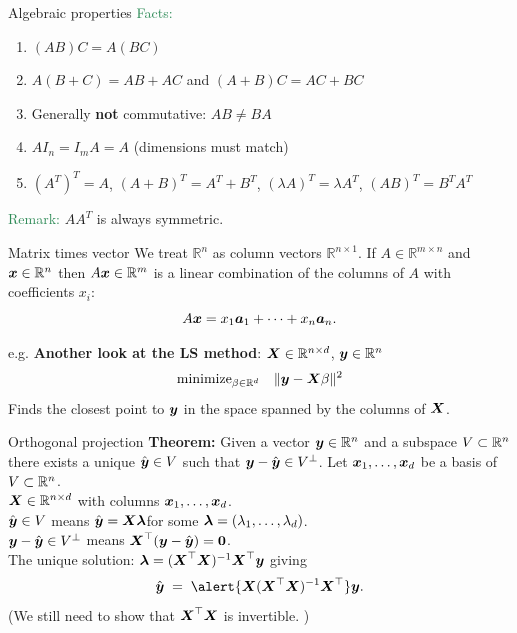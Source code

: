 \documentclass{beamer}
\begin{document}
\begin{frame}{Algebraic properties}
\textcolor{SeaGreen}{Facts:}
\begin{enumerate}
\item $(AB)C=A(BC)$\\[3mm]
\item $A(B+C)=AB+AC$ and $(A+B)C=AC+BC$\\[3mm]
\item Generally \textbf{not} commutative: $AB\neq BA$\\[3mm]
\item $AI_n=I_mA=A$ (dimensions must match)\\[3mm]
\item $(A^T)^T=A$, $(A+B)^T=A^T+B^T$, $(\lambda A)^T=\lambda A^T$, $(AB)^T=B^T A^T$
\end{enumerate}
\bigskip
 
\textcolor{SeaGreen}{Remark:} $AA^T$ is always symmetric.
\end{frame}

\begin{frame}{Matrix times vector}
We treat $\mathbb{R}^n$ as column vectors $\mathbb{R}^{n\times 1}$. If $A\in\mathbb{R}^{m\times n}$ and $\boldsymbol x\in\mathbb{R}^n$ then $A\boldsymbol x\in\mathbb{R}^m$ is a linear combination of the columns of $A$ with coefficients $x_i$:
\[
A\boldsymbol x = x_1\boldsymbol a_1+\cdots+x_n\boldsymbol a_n.
\]
\bigskip

e.g. \textbf{Another look at the LS method}: $\boldsymbol X\in \mathbb R^{n\times d}$, $\boldsymbol y\in \mathbb R^n$
$$
{\rm minimize}_{\beta\in \mathbb R^d}\quad \|\boldsymbol y-\boldsymbol X\beta\|^2
$$
Finds the closest point to $\boldsymbol y$ in the space spanned by the columns of $\boldsymbol X$.
\end{frame}

\begin{frame}[label=orthogonal2]{Orthogonal projection}
		\textbf{Theorem: }Given a vector $\boldsymbol y\in \mathbb R^n$ and a subspace $V\subset \mathbb R^n$ there exists a unique $\hat{\boldsymbol y}\in V$ such that \;\;$\boldsymbol y-\hat{\boldsymbol y}\in V^\perp$.
	Let $\boldsymbol x_1,\ldots,\boldsymbol x_d$ be a basis of $V\subset \mathbb R^n$.\\[.3cm]
	$\boldsymbol X\in \mathbb R^{n\times d}$ with columns  $\boldsymbol x_1,\ldots,\boldsymbol x_d$.\\[.5cm]
	$\hat{\boldsymbol y}\in V$ means \quad $\hat{\boldsymbol y}=\boldsymbol X\boldsymbol \lambda$\quad  for some $\boldsymbol \lambda=(\lambda_1,\ldots,\lambda_d)$.\\[.3cm]
	$\boldsymbol y-\hat{\boldsymbol y}\in V^\perp$ \quad means \quad $\boldsymbol X^\top(\boldsymbol y-\hat{\boldsymbol y})=\boldsymbol 0$.\\[.5cm]
	The unique solution: \quad $\boldsymbol \lambda=(\boldsymbol X^\top \boldsymbol X)^{-1}\boldsymbol X^\top\boldsymbol y$ giving
	$$
	\hat{\bs y}\;=\;\alert{\bs X (\bs X^\top \bs X)^{-1}\bs X^\top}\bs y.
	$$
	(We still need to show that $\boldsymbol X^\top \boldsymbol X$ is invertible. )
\end{frame}
\end{document}
